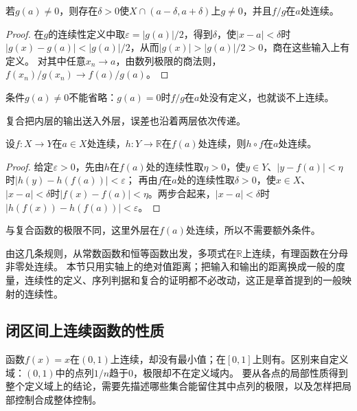 \begin{theorem}[商的连续性]
\label{thm:ru-continuity-quotient}
若$g(a)\neq0$，则存在$\delta>0$使$X\cap(a-\delta,a+\delta)$上$g\neq0$，并且$f/g$在$a$处连续。
\end{theorem}
\begin{proof}
在$g$的连续性定义中取$\varepsilon=|g(a)|/2$，得到$\delta$，使$|x-a|<\delta$时$|g(x)-g(a)|<|g(a)|/2$，从而$|g(x)|>|g(a)|/2>0$，商在这些输入上有定义。
对其中任意$x_n\to a$，由数列极限的商法则，$f(x_n)/g(x_n)\to f(a)/g(a)$。
\end{proof}
条件$g(a)\neq0$不能省略：$g(a)=0$时$f/g$在$a$处没有定义，也就谈不上连续。

复合把内层的输出送入外层，误差也沿着两层依次传递。
\begin{theorem}[复合函数的连续性]
\label{thm:ru-continuity-composition}
设$f:X\to Y$在$a\in X$处连续，$h:Y\to\mathbb R$在$f(a)$处连续，则$h\circ f$在$a$处连续。
\end{theorem}
\begin{proof}
给定$\varepsilon>0$，先由$h$在$f(a)$处的连续性取$\eta>0$，使$y\in Y$、$|y-f(a)|<\eta$时$|h(y)-h(f(a))|<\varepsilon$；
再由$f$在$a$处的连续性取$\delta>0$，使$x\in X$、$|x-a|<\delta$时$|f(x)-f(a)|<\eta$。两步合起来，$|x-a|<\delta$时$|h(f(x))-h(f(a))|<\varepsilon$。
\end{proof}
与复合函数的极限不同，这里外层在$f(a)$处连续，所以不需要额外条件。

由这几条规则，从常数函数和恒等函数出发，多项式在$\mathbb R$上连续，有理函数在分母非零处连续。
本节只用实轴上的绝对值距离；把输入和输出的距离换成一般的度量，连续性的定义、序列判据和复合的证明都不必改动，这正是章首提到的一般映射的连续性。

\subsection{闭区间上连续函数的性质}
\label{sec:ru-closed-interval-continuity}
\label{sec:analysis-metric-measurement}
\label{sec:analysis-set-metric}

函数$f(x)=x$在$(0,1)$上连续，却没有最小值；在$[0,1]$上则有。区别来自定义域：$(0,1)$中的点列$1/n$趋于$0$，极限却不在定义域内。
要从各点的局部性质得到整个定义域上的结论，需要先描述哪些集合能留住其中点列的极限，以及怎样把局部控制合成整体控制。

